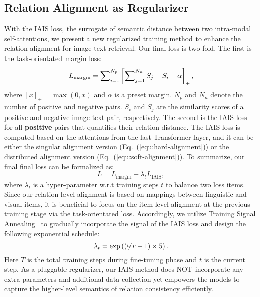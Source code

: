 \documentclass[11pt,a4paper]{article}
\begin{document}
\subsection{Relation Alignment as Regularizer}
\label{subsec:Relation Alignment as Regularizer}
With the IAIS loss, the surrogate of semantic distance between two intra-modal self-attentions, we present a new regularized training method to enhance the relation alignment for image-text retrieval. 
Our final loss is two-fold. The first is the task-orientated margin loss:
\begin{equation}
\small
    L_\text{margin} = \sum\nolimits_{i=1}^{N_p} \left[ \sum\nolimits_{j=1}^{N_n} S_j - S_i + \alpha \right]_+,
    \label{equ:margin-loss}
\end{equation}
where $[x]_+=\max (0,x)$ and $\alpha$ is a preset margin. 
$N_p$ and $N_n$ denote the number of positive and negative pairs. 
$S_i$ and $S_j$ are the similarity scores of a positive and negative image-text pair, respectively. 
The second is the IAIS loss for all \textbf{positive} pairs that quantifies their relation distance. 
The IAIS loss is computed based on the attentions from the last Transformer-layer, and it can be either the singular alignment version (Eq.~(\ref{equ:hard-alignment})) or the distributed alignment version (Eq.~(\ref{equ:soft-alignment})). 
To summarize, our final final loss can be formalized as: 
\begin{equation}
        L = L_\text{margin} + \lambda_t L_\text{IAIS},
\label{equ:final-loss}
\end{equation}
where $\lambda_t$ is a hyper-parameter w.r.t training steps $t$ to balance two loss items. 
Since our relation-level alignment is based on mappings between linguistic and visual items, it is beneficial to focus on the item-level alignment at the previous training stage via the task-orientated loss. Accordingly, we utilize Training Signal Annealing~\cite{uda} to gradually incorporate the signal of the IAIS loss and design the following exponential schedule:
\begin{equation}
\small
    \lambda_t = \exp\left( \left(\nicefrac{t}{T} - 1\right) \times 5 \right).
\label{equ:exp-schedule}
\end{equation}
Here $T$ is the total training steps during fine-tuning phase and $t$ is the current step. 
As a pluggable regularizer, our IAIS method does NOT incorporate any extra parameters and additional data collection yet empowers the models to capture the higher-level semantics of relation consistency efficiently. 
\end{document}
